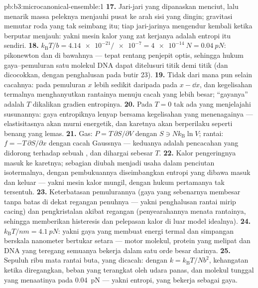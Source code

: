 \begin{solution}{pb:b3:microcanonical-ensemble:1}
\textbf{17.} Jari-jari yang dipanaskan menciut, lalu menarik massa
peleknya menjauhi pusat ke arah sisi yang dingin; gravitasi memutar roda
yang tak seimbang itu; tiap jari-jarinya mengendur kembali ketika berputar
menjauh: yakni mesin kalor yang zat kerjanya adalah entropi itu sendiri.
\textbf{18.} $k_{\text{B}}T/b = \num{4.14e-21}/\num{e-7} =
\qty{4e-14}{N} = \qty{0.04}{pN}$: pikonewton dan di bawahnya ---
tepat rentang penjepit optis, sehingga hukum gaya--pemuluran satu molekul
DNA dapat ditelusuri titik demi titik (dan dicocokkan, dengan penghalusan
pada butir 23).
\textbf{19.} Tidak dari mana pun selain cacahnya: pada pemuluran $x$
 lebih sedikit daripada pada $x - \dd x$, dan kegelisahan
termalnya menghanyutkan rantainya menuju cacah yang lebih besar;
``gayanya'' adalah $T$ dikalikan gradien entropinya.
\textbf{20.} Pada $T = 0$ tak ada yang menjelajahi susunannya: gaya
entropiknya lenyap bersama kegelisahan yang menenagainya --- elastisitasnya
akan murni energetik, dan karetnya akan berperilaku seperti benang yang
lemas.
\textbf{21.} Gas: $P = T\,\partial S/\partial V$ dengan $S \ni
Nk_{\text{B}}\ln V$; rantai: $f = -T\,\partial S/\partial x$ dengan
cacah Gaussnya --- keduanya adalah pencacahan yang didorong terhadap
sebuah , dan dihargai sebesar $T$.
\textbf{22.} Kalor pengeringnya masuk ke karetnya; sebagian diubah
menjadi usaha dalam penciutan isotermalnya, dengan pembukuannya
diseimbangkan entropi yang dibawa masuk dan keluar --- yakni mesin kalor
mungil, dengan hukum pertamanya tak tersentuh.
\textbf{23.} Keterbatasan pemulurannya (gaya yang sebenarnya membesar
tanpa batas di dekat regangan penuhnya --- yakni penghalusan rantai mirip
cacing) dan pengkristalan akibat regangan (penyearahannya menata
rantainya, sehingga memberikan histeresis dan pelepasan kalor di luar
model idealnya).
\textbf{24.} $k_{\text{B}}T/\unit{nm} = \qty{4.1}{pN}$: yakni gaya yang
membuat energi termal dan simpangan berskala nanometer bertukar setara
--- motor molekul, protein yang melipat dan DNA yang teregang semuanya
bekerja dalam satu orde besar darinya.
\textbf{25.} Sepuluh ribu mata rantai buta, yang dicacah: 
dengan $k = k_{\text{B}}T/Nb^2$, kehangatan ketika diregangkan, beban
yang terangkat oleh udara panas, dan molekul tunggal yang menaatinya pada
\qty{0.04}{pN} --- yakni entropi, yang bekerja sebagai gaya.
\end{solution}
